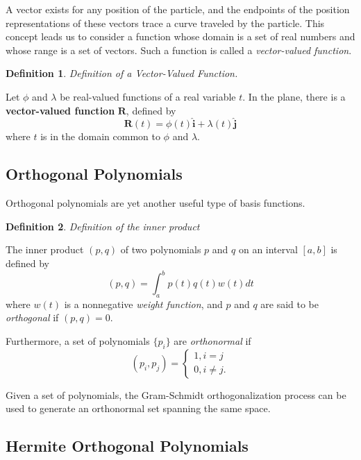 \documentclass[a4paper, 11pt]{article}
\newtheorem{definition}{Definition}
\begin{document}
A vector exists for any position of the particle, and the endpoints of the position representations of these vectors trace a curve traveled by the particle. This concept leads us to consider a function whose domain is a set of real numbers and whose range is a set of vectors. Such a function is called a \textit{vector-valued function}.

\begin{definition}
	Definition of a Vector-Valued Function.
\end{definition}
Let $\phi$ and $\lambda$ be real-valued functions of a real variable $t$. In the plane, there is a \textbf{vector-valued function} $\mathbf{R}$, defined by
$$\mathbf{R}(t) = \phi(t)\mathbf{\hat{i}} + \lambda(t)\mathbf{\hat{j}}$$
where $t$ is in the domain common to $\phi$ and $\lambda$.

\subsection{Orthogonal Polynomials}
Orthogonal polynomials are yet another useful type of basis functions.

\begin{definition}
	Definition of the inner product
\end{definition}
The inner product $(p, q)$ of two polynomials $p$ and $q$ on an interval $[a,b]$ is defined by
$$ (p, q) = \int_{a}^{b} p(t)q(t)w(t) dt$$
where $w(t)$ is a nonnegative \textit{weight function}, and $p$ and $q$ are said to be \textit{orthogonal} if $(p, q)=0$.

Furthermore, a set of polynomials $\lbrace{p_i}\rbrace$ are \textit{orthonormal} if
$$(p_i, p_j) = 
\begin{cases}
	1, i = j \\
	0, i \neq j.
\end{cases}
$$

Given a set of polynomials, the Gram-Schmidt orthogonalization process can be used to generate an orthonormal set spanning the same space.

\subsection{Hermite Orthogonal Polynomials}
\end{document}

